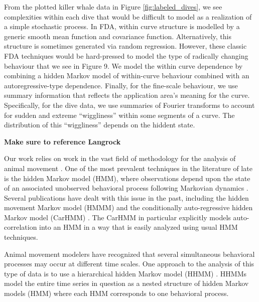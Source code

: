 From the plotted killer whale data in Figure {\ref{fig:labeled_dives}}, we see complexities within each dive that would be difficult to model as a realization of a simple stochastic process. 
In FDA, within curve structure is modelled by a generic smooth mean function and covariance function.
Alternatively, this structure is sometimes generated via random regression.
However, these classic FDA techniques would be hard-pressed to model the type of radically changing behaviour that we see in Figure 9.  
We model the within curve dependence by combining a hidden Markov model of within-curve behaviour combined with an autoregressive-type dependence.
Finally, for the fine-scale behaviour, we use summary information that reflects the application area's meaning for the curve.  Specifically, for the dive data, we use summaries of Fourier transforms to account for sudden and extreme ``wiggliness'' within some segments of a curve. 
The distribution of this ``wiggliness'' depends on the hiddent state.


{\bf{ Make sure to reference Langrock}}
 

Our work relies on work in the vast field of methodology for the analysis of animal movement
\citep{Hooten:2017}.
One of the most prevalent techniques in the literature of late is the hidden Markov model (HMM), where observations depend upon the state of an associated unobserved behavioral process following Markovian dynamics \citep{Patterson:2017}. 
%
 Several publications have dealt with this issue in the past, including the hidden movement Markov model (HMMM) \citep{Whoriskey:2016} and the conditionally auto-regressive hidden Markov model (CarHMM) \citep{Lawler:2019}. 
 The CarHMM in particular explicitly models auto-correlation into an HMM in a way that is easily analyzed using usual HMM techniques.

Animal movement modelers have recognized that several simultaneous behavioral processes may occur at different time scales. 
One approach to the analysis of this type of data is to use a hierarchical hidden Markov model (HHMM) \citep{Barajas:2017} \citep{Adam:2019}. 
HHMMs model the entire time series in question as a nested structure of hidden Markov models (HMM) where each HMM corresponds to one behavioral process.


